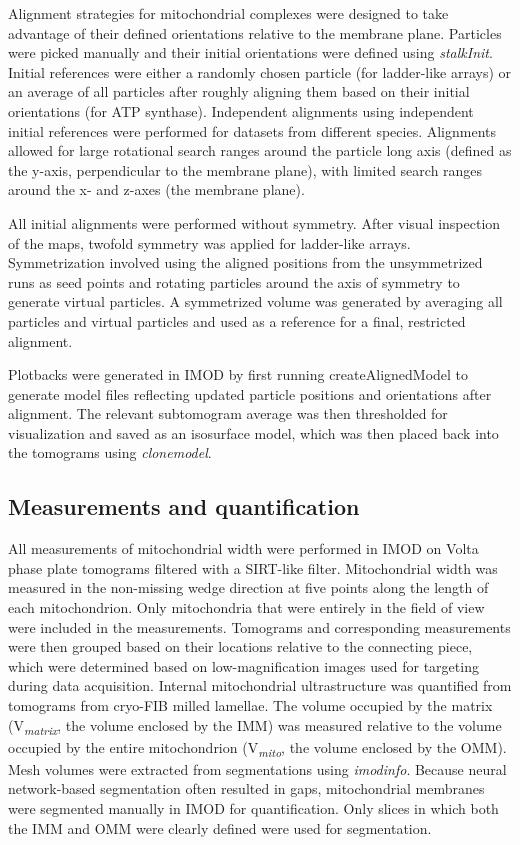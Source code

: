 Alignment strategies for mitochondrial complexes were designed to take advantage of their defined orientations relative to the membrane plane. Particles were picked manually and their initial orientations were defined using \emph{stalkInit}. Initial references were either a randomly chosen particle (for ladder-like arrays) or an average of all particles after roughly aligning them based on their initial orientations (for ATP synthase). Independent alignments using independent initial references were performed for datasets from different species. Alignments allowed for large rotational search ranges around the particle long axis (defined as the y-axis, perpendicular to the membrane plane), with limited search ranges around the x- and z-axes (the membrane plane).

All initial alignments were performed without symmetry. After visual inspection of the maps, twofold symmetry was applied for ladder-like arrays. Symmetrization involved using the aligned positions from the unsymmetrized runs as seed points and rotating particles around the axis of symmetry to generate virtual particles. A symmetrized volume was generated by averaging all particles and virtual particles and used as a reference for a final, restricted alignment.

Plotbacks were generated in IMOD by first running createAlignedModel to generate model files reflecting updated particle positions and orientations after alignment. The relevant subtomogram average was then thresholded for visualization and saved as an isosurface model, which was then placed back into the tomograms using \emph{clonemodel}.
%
\subsection*{Measurements and quantification}
All measurements of mitochondrial width were performed in IMOD on Volta phase plate tomograms filtered with a SIRT-like filter. Mitochondrial width was measured in the non-missing wedge direction at five points along the length of each mitochondrion. Only mitochondria that were entirely in the field of view were included in the measurements. Tomograms and corresponding measurements were then grouped based on their locations relative to the connecting piece, which were determined based on low-magnification images used for targeting during data acquisition. Internal mitochondrial ultrastructure was quantified from tomograms from cryo-FIB milled lamellae. The volume occupied by the matrix (V\textsubscript{\emph{matrix}}, the volume enclosed by the IMM) was measured relative to the volume occupied by the entire mitochondrion (V\textsubscript{\emph{mito}}, the volume enclosed by the OMM). Mesh volumes were extracted from segmentations using \emph{imodinfo}. Because neural network-based segmentation often resulted in gaps, mitochondrial membranes were segmented manually in IMOD for quantification. Only slices in which both the IMM and OMM were clearly defined were used for segmentation.
%
